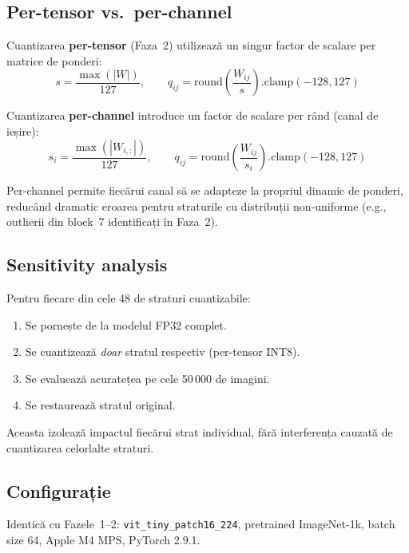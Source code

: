 \documentclass[12pt,a4paper]{article}
\begin{document}
\subsection{Per-tensor vs.\ per-channel}

Cuantizarea \textbf{per-tensor} (Faza~2) utilizează un singur factor de
scalare per matrice de ponderi:
\begin{equation}
  s = \frac{\max(|W|)}{127}, \qquad
  q_{ij} = \text{round}\!\left(\frac{W_{ij}}{s}\right).\text{clamp}(-128, 127)
\end{equation}

Cuantizarea \textbf{per-channel} introduce un factor de scalare per rând
(canal de ieșire):
\begin{equation}
  s_i = \frac{\max(|W_{i,:}|)}{127}, \qquad
  q_{ij} = \text{round}\!\left(\frac{W_{ij}}{s_i}\right).\text{clamp}(-128, 127)
\end{equation}

Per-channel permite fiecărui canal să se adapteze la propriul dinamic de
ponderi, reducând dramatic eroarea pentru straturile cu distribuții
non-uniforme (e.g., outlierii din block~7 identificați în Faza~2).

\subsection{Sensitivity analysis}

Pentru fiecare din cele 48 de straturi cuantizabile:
\begin{enumerate}
  \item Se pornește de la modelul FP32 complet.
  \item Se cuantizează \emph{doar} stratul respectiv (per-tensor INT8).
  \item Se evaluează acuratețea pe cele 50\,000 de imagini.
  \item Se restaurează stratul original.
\end{enumerate}

Aceasta izolează impactul fiecărui strat individual, fără interferența
cauzată de cuantizarea celorlalte straturi.

\subsection{Configurație}

Identică cu Fazele~1--2: \texttt{vit\_tiny\_patch16\_224}, pretrained
ImageNet-1k, batch size 64, Apple M4 MPS, PyTorch 2.9.1.
\end{document}
